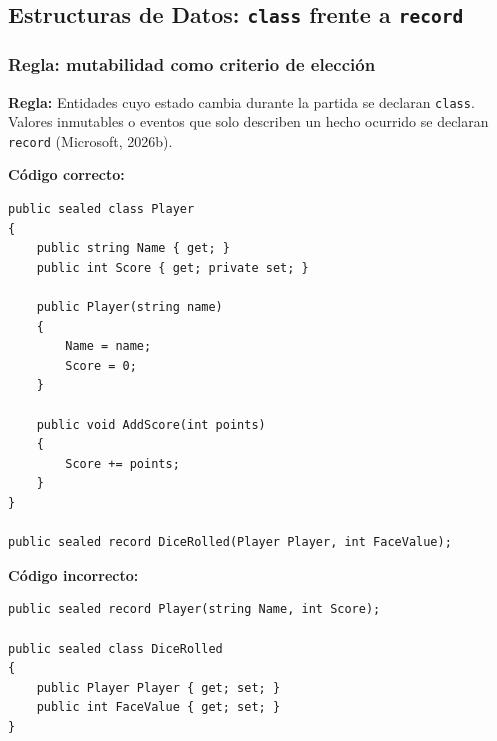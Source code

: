 \subsection{Estructuras de Datos: \texttt{class} frente a \texttt{record}}

\subsubsection{Regla: mutabilidad como criterio de elección}

\textbf{Regla:} Entidades cuyo estado cambia durante la partida se declaran \texttt{class}. Valores inmutables o eventos que solo describen un hecho ocurrido se declaran \texttt{record} (Microsoft, 2026b).

\textbf{Código correcto:}
\begin{lstlisting}[style=csharpstyle]
public sealed class Player
{
    public string Name { get; }
    public int Score { get; private set; }

    public Player(string name)
    {
        Name = name;
        Score = 0;
    }

    public void AddScore(int points)
    {
        Score += points;
    }
}

public sealed record DiceRolled(Player Player, int FaceValue);
\end{lstlisting}

\textbf{Código incorrecto:}
\begin{lstlisting}[style=csharpstyle]
public sealed record Player(string Name, int Score);

public sealed class DiceRolled
{
    public Player Player { get; set; }
    public int FaceValue { get; set; }
}
\end{lstlisting}
